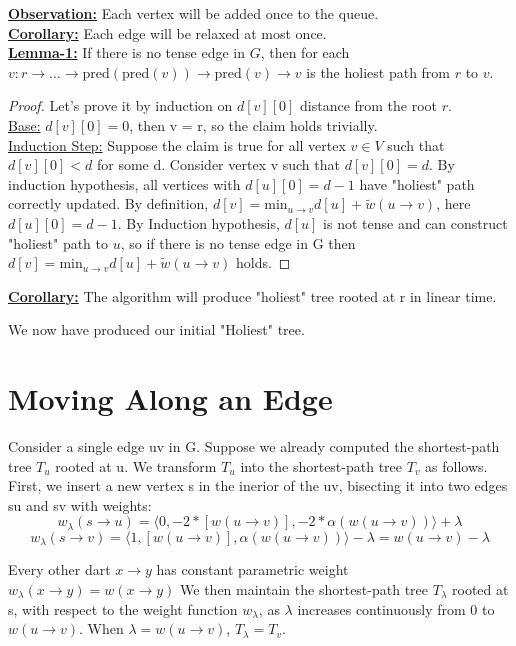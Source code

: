 \documentclass{article}
\begin{document}
\textbf{\underline{Observation:}} Each vertex will be added once to the queue. \\

\textbf{\underline{Corollary:}} Each edge will be relaxed at most once. \\

\textbf{\underline{Lemma-1:}} If there is no tense edge in $G$, then for each 
$v: r \rightarrow \ldots \rightarrow \text{pred}(\text{pred}(v)) \rightarrow 
\text{pred}(v) \rightarrow v$ is the holiest path from $r$ to $v$.

\begin{proof} Let's prove it by induction on $d[v][0]$ distance from the root $r$. \\
\underline{Base:} $d[v][0] = 0$, then v = r, so the claim holds trivially. \\
\underline{Induction Step:} Suppose the claim is true for all vertex $v \in V$ 
such that $d[v][0] < d$ for some d. Consider vertex v such that $d[v][0] = d$. 
By induction hypothesis, all vertices with $d[u][0] = d-1$ have "holiest" path 
correctly updated. By definition, $d[v] = \text{min}_{u \rightarrow v}{d[u] + 
\tilde w(u \rightarrow v)}$, here $d[u][0] = d-1$. By Induction hypothesis, $d[u]$ 
is not tense and can construct "holiest" path to $u$, so if there is no tense
edge in G then $d[v] = \text{min}_{u \rightarrow v}{d[u] + \tilde w(u \rightarrow v)}$ 
holds.
\end{proof}

\textbf{\underline{Corollary:}} The algorithm will produce "holiest" tree rooted at r in linear time.

We now have produced our initial "Holiest" tree.

\section{Moving Along an Edge}
Consider a single edge uv in G. Suppose we already computed the shortest-path
tree $T_u$ rooted at u. We transform $T_u$ into the shortest-path tree
$T_v$ as follows. First, we insert a new vertex s in the inerior of the uv,
bisecting it into two edges su and sv with weights:
\[ w_{\lambda}(s \rightarrow u) = \langle 0, -2 * [w(u \rightarrow v)], 
-2 * \alpha(w(u \rightarrow v)) \rangle  + \lambda \]
\[ w_{\lambda}(s \rightarrow v) = \langle 1, [w(u \rightarrow v)], 
\alpha(w(u \rightarrow v)) \rangle - \lambda = w(u \rightarrow v) - \lambda \]

Every other dart $x \rightarrow y$ has constant parametric weight 
$w_{\lambda}(x \rightarrow y) = w(x \rightarrow y)$
We then maintain the shortest-path tree $T_{\lambda}$ rooted at s, with respect
to the weight function $w_{\lambda}$, as $\lambda$ increases continuously from
0 to $w(u \rightarrow v)$. When $\lambda = w(u \rightarrow v)$, 
$T_{\lambda} = T_v$.
\end{document}
